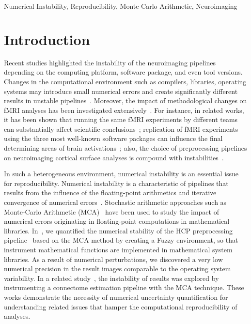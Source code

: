 \documentclass[conference]{IEEEtran}
\begin{document}
\begin{IEEEkeywords}
  Numerical Instability, Reproducibility, Monte-Carlo Arithmetic, Neuroimaging
\end{IEEEkeywords}


\section{Introduction}

Recent studies highlighted the instability of the neuroimaging pipelines depending on the computing platform,
software package, and even tool versions. Changes in the computational
environment such as compilers, libraries, operating systems may introduce small numerical errors and create
significantly different results in unstable pipelines~\cite{Glatard2015,Gronenschild2012,salari2020spot}.
Moreover, the impact of methodological changes on fMRI analyses has been investigated extensively~\cite{bowring2019exploring,botvinik2020variability,bhagwat2021understanding,carp2012plurality}.
For instance, in related works, it has been shown that running the same fMRI experiments by different teams can substantially affect
scientific conclusions~\cite{botvinik2020variability,carp2012plurality};
replication of fMRI experiments using the three most well-known software packages can influence the final determining areas of
brain activations~\cite{bowring2019exploring}; %
also, the choice of preprocessing pipelines on neuroimaging cortical surface analyses is compound with instabilities~\cite{bhagwat2021understanding}.

In such a heterogeneous environment, numerical instability is an essential issue for reproducibility.
Numerical instability is a characteristic of pipelines that results from the influence of the floating-point arithmetics
and iterative convergence of numerical errors~\cite{freitas2002issue}.
Stochastic arithmetic approaches such as Monte-Carlo Arithmetic (MCA)~\cite{Parker1997-qq} have been used to study the impact of numerical errors
originating in floating-point computations in mathematical libraries.
In~\cite{salari2021accurate}, we quantified the numerical stability of the HCP preprocessing pipeline~\cite{glasser2013} based on the MCA method
by creating a Fuzzy environment, so that instrument mathematical functions are implemented in mathematical system libraries.
As a result of numerical perturbations, we discovered a very low numerical precision in the result images comparable to the operating system variability.
In a related study~\cite{kiar2020numerical}, the instability of results was explored by instrumenting a connectome estimation pipeline with the MCA technique.
These works demonstrate the necessity of numerical uncertainty quantification for understanding related issues that hamper the computational reproducibility of analyses.
\end{document}
